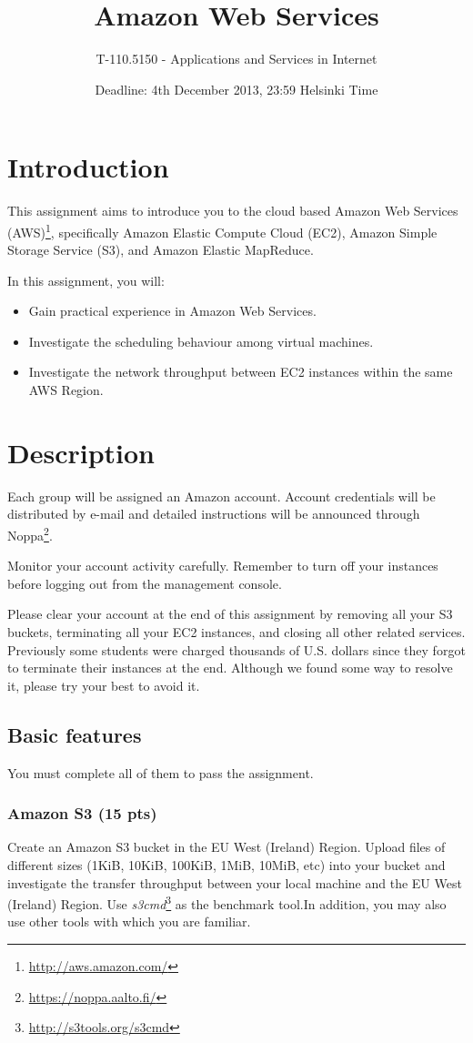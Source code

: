 \documentclass[12pt, a4paper]{article}
\title{Amazon Web Services}
\author{T-110.5150 - Applications and Services in Internet}
\date{Deadline: 4th December 2013, 23:59 Helsinki Time}
\begin{document}
\maketitle
\section{Introduction}

This assignment aims to introduce you to the cloud based Amazon Web Services (AWS)\footnote{\url{http://aws.amazon.com/}}, specifically Amazon Elastic Compute Cloud (EC2), Amazon Simple Storage Service (S3), and Amazon Elastic MapReduce.

In this assignment, you will:
\begin{itemize}
\item Gain practical experience in Amazon Web Services.
\item Investigate the scheduling behaviour among virtual machines.
\item Investigate the network throughput between EC2 instances within the same AWS Region.
\end{itemize}

\section{Description}
Each group will be assigned an Amazon account.
Account credentials will be distributed by e-mail and detailed instructions will be announced through Noppa\footnote{\url{https://noppa.aalto.fi/}}.

Monitor your account activity carefully.
Remember to turn off your instances before logging out from the management console.

Please clear your account at the end of this assignment by removing all your S3 buckets, terminating all your EC2 instances, and closing all other related services.
Previously some students were charged thousands of U.S. dollars since they forgot to terminate their instances at the end.
Although we found some way to resolve it, please try your best to avoid it.


\subsection{Basic features}
You must complete all of them to pass the assignment.

\subsubsection{Amazon S3 (15 pts)}
Create an Amazon S3 bucket in the EU West (Ireland) Region.
Upload files of different sizes (1KiB, 10KiB, 100KiB, 1MiB, 10MiB, etc) into your bucket and investigate the transfer throughput between your local machine and the EU West (Ireland) Region.
Use \emph{s3cmd}\footnote{\url{http://s3tools.org/s3cmd}} as the benchmark tool.In addition, you may also use other tools with which you are familiar.
\end{document}
